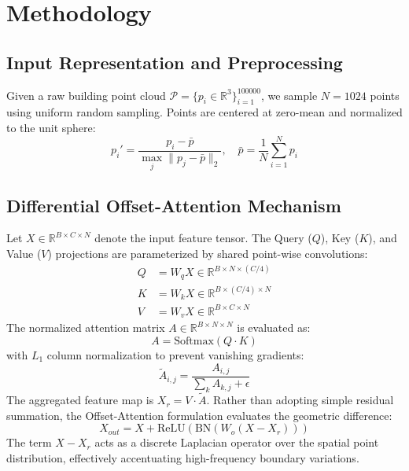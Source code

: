 \section{Methodology}
\label{sec:methodology}

\subsection{Input Representation and Preprocessing}
Given a raw building point cloud $\mathcal{P} = \{p_i \in \mathbb{R}^3\}_{i=1}^{100000}$, we sample $N = 1024$ points using uniform random sampling. Points are centered at zero-mean and normalized to the unit sphere:
\begin{equation}
    p_i' = \frac{p_i - \bar{p}}{\max_j \|p_j - \bar{p}\|_2}, \quad \bar{p} = \frac{1}{N}\sum_{i=1}^N p_i
\end{equation}

\subsection{Differential Offset-Attention Mechanism}
Let $X \in \mathbb{R}^{B \times C \times N}$ denote the input feature tensor. The Query ($Q$), Key ($K$), and Value ($V$) projections are parameterized by shared point-wise convolutions:
\begin{align}
    Q &= W_q X \in \mathbb{R}^{B \times N \times (C/4)} \\
    K &= W_k X \in \mathbb{R}^{B \times (C/4) \times N} \\
    V &= W_v X \in \mathbb{R}^{B \times C \times N}
\end{align}
The normalized attention matrix $A \in \mathbb{R}^{B \times N \times N}$ is evaluated as:
\begin{equation}
    A = \text{Softmax}(Q \cdot K)
\end{equation}
with $L_1$ column normalization to prevent vanishing gradients:
\begin{equation}
    \tilde{A}_{i,j} = \frac{A_{i,j}}{\sum_{k} A_{k,j} + \epsilon}
\end{equation}
The aggregated feature map is $X_r = V \cdot \tilde{A}$. Rather than adopting simple residual summation, the Offset-Attention formulation evaluates the geometric difference:
\begin{equation}
    X_{out} = X + \text{ReLU}\left(\text{BN}\left(W_o (X - X_r)\right)\right)
\end{equation}
The term $X - X_r$ acts as a discrete Laplacian operator over the spatial point distribution, effectively accentuating high-frequency boundary variations.


